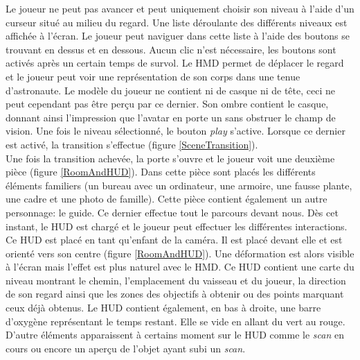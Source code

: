 		\begin{minipage}{\linewidth}
			\label{LevelSelection}
		\end{minipage}\medskip	
	
		Le joueur ne peut pas avancer et peut uniquement choisir son niveau à l'aide d'un curseur situé au milieu du regard. Une liste déroulante des différents niveaux est affichée à l'écran. Le joueur peut naviguer dans cette liste à l'aide des boutons se trouvant en dessus et en dessous. Aucun clic n'est nécessaire, les boutons sont activés après un certain temps de survol. Le HMD permet de déplacer le regard et le joueur peut voir une représentation de son corps dans une tenue d'astronaute. Le modèle du joueur ne contient ni de casque ni de tête, ceci ne peut cependant pas être perçu par ce dernier. Son ombre contient le casque, donnant ainsi l'impression que l'avatar en porte un sans obstruer le champ de vision. Une fois le niveau sélectionné, le bouton \textit{play} s'active. Lorsque ce dernier est activé, la transition s'effectue (figure \ref{SceneTransition}).
		\\
		
		Une fois la transition achevée, la porte s'ouvre et le joueur voit une deuxième pièce (figure \ref{RoomAndHUD}). Dans cette pièce sont placés les différents éléments familiers (un bureau avec un ordinateur, une armoire, une fausse plante, une cadre et une photo de famille). Cette pièce contient également un autre personnage: le guide. Ce dernier effectue tout le parcours devant nous. Dès cet instant, le HUD est chargé et le joueur peut effectuer les différentes interactions. Ce HUD est placé en tant qu'enfant de la caméra. Il est placé devant elle et est orienté vers son centre (figure \ref{RoomAndHUD}). Une déformation est alors visible à l'écran mais l'effet est plus naturel avec le HMD. Ce HUD contient une carte du niveau montrant le chemin, l'emplacement du vaisseau et du joueur, la direction de son regard ainsi que les zones des objectifs à obtenir ou des points marquant ceux déjà obtenus. Le HUD contient également, en bas à droite, une barre d'oxygène représentant le temps restant. Elle se vide en allant du vert au rouge. D'autre éléments apparaissent à certains moment sur le HUD comme le \textit{scan} en cours ou encore un aperçu de l'objet ayant subi un \textit{scan}.\medskip		
	

